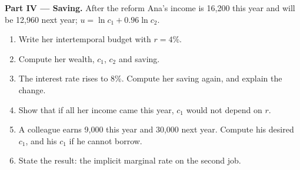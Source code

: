 \begin{problem}
\medskip\noindent\textbf{Part IV --- Saving.} After the reform Ana's income is
16,200 this year and will be 12,960 next year; $u = \ln c_1 + 0.96\ln c_2$.
\begin{enumerate}[resume]
  \item Write her intertemporal budget with $r = 4\%$.
  \item Compute her wealth, $c_1$, $c_2$ and saving.
  \item The interest rate rises to $8\%$. Compute her saving again, and explain the change.
  \item Show that if all her income came this year, $c_1$ would not depend on $r$.
  \item A colleague earns 9,000 this year and 30,000 next year. Compute his desired $c_1$, and his $c_1$ if he cannot borrow.
  \item State the result: the implicit marginal rate on the second job.
\end{enumerate}
\end{problem}
